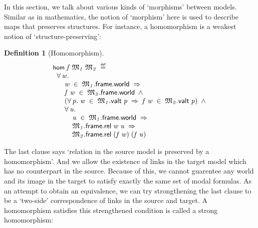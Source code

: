 \documentclass[letterpaper]{article}
\newtheorem{defn}{Definition}
\renewcommand{\HOLConst}[1]{{\textsf{\upshape\small #1}}}
\newenvironment{holmath}{\begin{displaymath}\begin{array}{l}}{\end{array}\end{displaymath}\ignorespacesafterend}
\begin{document}
In this section, we talk about various kinds of `morphisms' between models. Similar as in mathematics, the notion of `morphism' here is used to describe maps that preserves structures. For instance, a homomorphism is a weakest notion of `structure-preserving':
\begin{defn}[Homomorphism]
\begin{holmath}
  \HOLConst{hom}\;\HOLFreeVar{f}\;\HOLFreeVar{\ensuremath{\mathfrak{M}\sb{1}}}\;\HOLFreeVar{\ensuremath{\mathfrak{M}\sb{2}}}\;\HOLSymConst{\HOLTokenDefEquality{}}\\
\;\;\HOLSymConst{\HOLTokenForall{}}\HOLBoundVar{w}.\\
\;\;\;\;\;\;\HOLBoundVar{w}\;\HOLSymConst{\HOLTokenIn{}}\;\HOLFreeVar{\ensuremath{\mathfrak{M}\sb{1}}}.\HOLFieldName{frame}.\HOLFieldName{world}\;\HOLSymConst{\HOLTokenImp{}}\\
\;\;\;\;\;\;\HOLFreeVar{f}\;\HOLBoundVar{w}\;\HOLSymConst{\HOLTokenIn{}}\;\HOLFreeVar{\ensuremath{\mathfrak{M}\sb{2}}}.\HOLFieldName{frame}.\HOLFieldName{world}\;\HOLSymConst{\HOLTokenConj{}}\\
\;\;\;\;\;\;(\HOLSymConst{\HOLTokenForall{}}\HOLBoundVar{p}.\;\HOLBoundVar{w}\;\HOLSymConst{\HOLTokenIn{}}\;\HOLFreeVar{\ensuremath{\mathfrak{M}\sb{1}}}.\HOLFieldName{valt}\;\HOLBoundVar{p}\;\HOLSymConst{\HOLTokenImp{}}\;\HOLFreeVar{f}\;\HOLBoundVar{w}\;\HOLSymConst{\HOLTokenIn{}}\;\HOLFreeVar{\ensuremath{\mathfrak{M}\sb{2}}}.\HOLFieldName{valt}\;\HOLBoundVar{p})\;\HOLSymConst{\HOLTokenConj{}}\\
\;\;\;\;\;\;\HOLSymConst{\HOLTokenForall{}}\HOLBoundVar{u}.\\
\;\;\;\;\;\;\;\;\;\;\HOLBoundVar{u}\;\HOLSymConst{\HOLTokenIn{}}\;\HOLFreeVar{\ensuremath{\mathfrak{M}\sb{1}}}.\HOLFieldName{frame}.\HOLFieldName{world}\;\HOLSymConst{\HOLTokenImp{}}\\
\;\;\;\;\;\;\;\;\;\;\HOLFreeVar{\ensuremath{\mathfrak{M}\sb{1}}}.\HOLFieldName{frame}.\HOLFieldName{rel}\;\HOLBoundVar{w}\;\HOLBoundVar{u}\;\HOLSymConst{\HOLTokenImp{}}\\
\;\;\;\;\;\;\;\;\;\;\HOLFreeVar{\ensuremath{\mathfrak{M}\sb{2}}}.\HOLFieldName{frame}.\HOLFieldName{rel}\;(\HOLFreeVar{f}\;\HOLBoundVar{w})\;(\HOLFreeVar{f}\;\HOLBoundVar{u})
\end{holmath}
\end{defn}
The last clause says `relation in the source model is preserved by a homomorphism'. And we allow the existence of links in the target model which has no counterpart in the source. Because of this, we cannot guarentee any world and its image in the target to satisfy exactly the same set of modal formulas. As an attempt to obtain an equivalence, we can try strongthening the last clause to be a `two-side' correspondence of links in the source and target. A homomorphism satisfies this strengthened condition is called a strong homomorphism:
\end{document}
